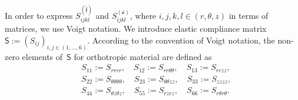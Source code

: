 \documentclass[preprint,12pt,times]{elsarticle}
\numberwithin{equation}{section}
\newcommand{\physe}{\hat{\mathscr{e}}} %
\newcommand{\physf}{\hat{\boldsymbol{\mathfrak{f}}}}
\renewcommand{\u}[1]{\boldsymbol{#1}}
\newcommand{\usf}[1]{\u{\mathsf #1}}
\newcommand{\pr}[1]{\left( #1 \right)}
\newcommand{\incylinder}{\in(r,\theta, z)}
\newcommand{\insix}{\in(1,\ldots,6)}
\renewcommand{\>}{$\Rightarrow$}
\begin{document}
In order to express $S_{ijkl}^{\pr{\physf}}$ and $S_{ijkl}^{\pr{\physe}}$, where $i,j,k,l \incylinder$ in terms of matrices, we use Voigt notation.
We introduce elastic compliance matrix~$\usf{S} := \pr{S_{ij}}_{i,j \insix }$.
According to the convention of Voigt notation, the non-zero elements of~$\usf{S}$ for orthotropic material are defined as
\begin{align*}
& S_{11} := S_{rrrr},\quad S_{12} := S_{rr\theta\theta},\quad S_{13} := S_{rrzz}, \\
& S_{22} := S_{\theta\theta\theta\theta},\quad S_{23} := S_{\theta\theta zz},\quad S_{33} := S_{zzzz}, \\
& S_{44} :=  S_{\theta z\theta z},\quad S_{55} :=  S_{rzrz},\quad S_{66} := S_{r\theta r\theta}.
\end{align*}

\end{document}
